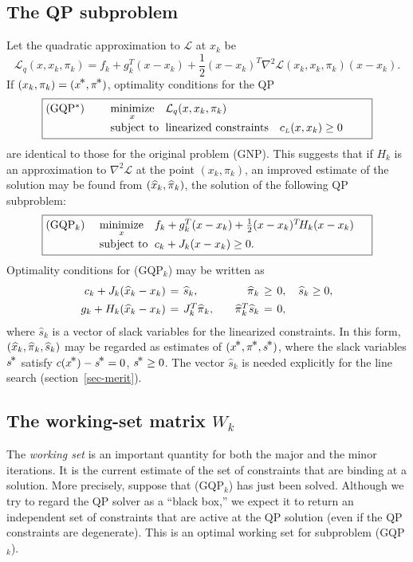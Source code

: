 \documentclass[draft,leqno,onefignum,onetabnum]{siamltex}
\makeatletter
\def\half  {{\textstyle{\frac12}}}
\def\Hess{\nabla^2}
\def\minim{\mathop{\hbox{\rm minimize}}}
\def\minimize#1{{\displaystyle\minim_{#1}}}
\def\nthinsp{\mskip -2   mu}
\def\Lscr{{\mathcal L}}
\def\pihat{\skew1\widehat \pi}
\def\pistar{\pi\superstar}
\def\shat{\widehat s}
\def\sstar{s\superstar}
\def\subject{\mbox{\rm subject to}}
\def\superstar{^{\raise 0.5pt\hbox{$\nthinsp *$}}}
\def\T{^T\!}
\def\xhat{\skew{2.8}\widehat x}
\def\xstar{x\superstar}
\def\GQPk{GQP$_k$}
\def\fk{f_k}
\def\gk{g_k}
\def\ck{c_k}
\def\Jk{J_k}
\def\cL{c_{\scriptscriptstyle L}} %
\def\L {\Lscr}                    %
\def\LQ{\Lscr_q}                  %
\def\problem#1#2#3#4{\fbox
   {\begin{tabular*}{0.84\textwidth}
    {@{}l@{\extracolsep{\fill}}l@{\extracolsep{6pt}}l@{\extracolsep{\fill}}c@{}}
      #1 & $\minimize{#2}$ & $#3$ & $ $ \\[5pt]
         & $\subject$      & $#4$ & $ $
    \end{tabular*}}}
\makeatother
\begin{document}
 \subsection{The QP subproblem}  \label{sec-GQP}

Let the quadratic approximation to $\L$ at $x_k$ be
$$
    \LQ(x,x_k,\pi_k) =  \fk + \gk\T (x - x_k)
                      + \half (x - x_k)^T \Hess\L(x_k,x_k,\pi_k) (x - x_k).
$$
If $(x_k,\pi_k) = (\xstar, \pistar)$, optimality conditions for the
QP
$$
   \problem{(GQP$^*$)}{x}
           {\LQ(x,x_k,\pi_k)}
           {\hbox{linearized constraints \ \ }\cL(x,x_k) \ge 0}
$$
are identical to those for the original problem (GNP)\@.  This suggests
that if $H_k$ is an approximation to $\Hess\L$ at the point $(x_k,\pi_k)$,
an improved estimate of the solution may be found from $(\xhat_k,\pihat_k)$,
the solution of the following QP subproblem:
$$
   \problem{(\GQPk)}{x}
           {\fk + \gk^T(x-x_k) + \half(x-x_k)\T H_k (x-x_k)}
           {\ck + \Jk(x-x_k) \ge 0.}
$$
Optimality conditions for (\GQPk) may be written as
$$
  \begin{array}{r@{\hspace{4pt}}c@{\hspace{4pt}}l@{\hspace{20pt}}%
                                r@{\hspace{4pt}}c@{\hspace{4pt}}l}
   \ck + \Jk(\xhat_k-x_k)      &=  & \shat_k,              &%
                      \pihat_k &\ge&  0,  \quad \shat_k\ge 0,        \\[1ex]
   \gk + H_k(\xhat_k-x_k)      &=  &  \Jk^T\pihat_k,       &%
             \pihat_k^T\shat_k &=  &  0,
  \end{array}
$$
where $\shat_k$ is a vector of slack variables for the linearized
constraints.  In this form, $(\xhat_k,\pihat_k,\shat_k)$ may be
regarded as estimates of $(\xstar, \pistar, \sstar)$, where the
slack variables $\sstar$ satisfy $c(\xstar) - \sstar = 0$, $\sstar \ge 0$.
The vector $\shat_k$ is needed explicitly for the line search
(section~\ref{sec-merit}).


 \subsection{The working-set matrix \protect\boldmath$W_k$} \label{sec-WS}

 The \emph{working set} is an important quantity for both the major and
the minor iterations.  It is the current estimate of the set of
constraints that are binding at a solution.
More precisely, suppose that (\GQPk) has just been solved.
Although we try to regard the QP solver as a ``black box,''
we expect it to return an independent set of constraints
that are active at the QP solution
(even if the QP constraints are degenerate).
This is an optimal working set for subproblem (\GQPk).
\end{document}
